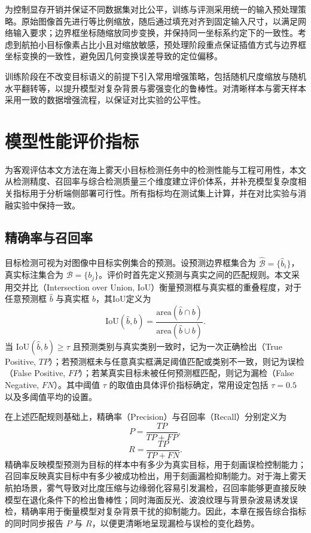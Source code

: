 为控制显存开销并保证不同数据集对比公平，训练与评测采用统一的输入预处理策略。原始图像首先进行等比例缩放，随后通过填充对齐到固定输入尺寸，以满足网络输入要求；边界框坐标随缩放同步变换，并保持同一坐标系约定下的一致性。考虑到航拍小目标像素占比小且对缩放敏感，预处理阶段重点保证插值方式与边界框坐标变换的一致性，避免因几何变换误差导致的定位偏移。

训练阶段在不改变目标语义的前提下引入常用增强策略，包括随机尺度缩放与随机水平翻转等，以提升模型对复杂背景与雾强变化的鲁棒性。对清晰样本与雾天样本采用一致的数据增强流程，以保证对比实验的公平性。

\section{模型性能评价指标}
\label{sec:metrics}

为客观评估本文方法在海上雾天小目标检测任务中的检测性能与工程可用性，本文从检测精度、召回率与综合检测质量三个维度建立评价体系，并补充模型复杂度相关指标用于分析端侧部署可行性。所有指标均在测试集上计算，并在对比实验与消融实验中保持一致。

\subsection{精确率与召回率}

目标检测可视为对图像中目标实例集合的预测。设预测边界框集合为 $\hat{\mathcal{B}}=\{\hat{b}_i\}$，真实标注集合为 $\mathcal{B}=\{b_j\}$。评价时首先定义预测与真实之间的匹配规则。本文采用交并比（Intersection over Union, IoU）衡量预测框与真实框的重叠程度，对于任意预测框 $\hat{b}$ 与真实框 $b$，其IoU定义为
\begin{equation}
\mathrm{IoU}(\hat{b},b)=\frac{\mathrm{area}(\hat{b}\cap b)}{\mathrm{area}(\hat{b}\cup b)}.
\end{equation}
当 $\mathrm{IoU}(\hat{b},b)\ge \tau$ 且预测类别与真实类别一致时，记为一次正确检出（True Positive, $TP$）；若预测框未与任意真实框满足阈值匹配或类别不一致，则记为误检（False Positive, $FP$）；若某真实目标未被任何预测框匹配，则记为漏检（False Negative, $FN$）。其中阈值 $\tau$ 的取值由具体评价指标确定，常用设定包括 $\tau=0.5$ 以及多阈值平均的设置。

在上述匹配规则基础上，精确率（Precision）与召回率（Recall）分别定义为
\begin{equation}
P=\frac{TP}{TP+FP},
\end{equation}
\begin{equation}
R=\frac{TP}{TP+FN}.
\end{equation}
精确率反映模型预测为目标的样本中有多少为真实目标，用于刻画误检控制能力；召回率反映真实目标中有多少被成功检出，用于刻画漏检抑制能力。对于海上雾天航拍场景，雾气导致对比度压缩与边缘弱化容易引发漏检，召回率能够更直接反映模型在退化条件下的检出鲁棒性；同时海面反光、波浪纹理与背景杂波易诱发误检，精确率用于衡量模型对复杂背景干扰的抑制能力。因此，本章在报告综合指标的同时同步报告 $P$ 与 $R$，以便更清晰地呈现漏检与误检的变化趋势。

